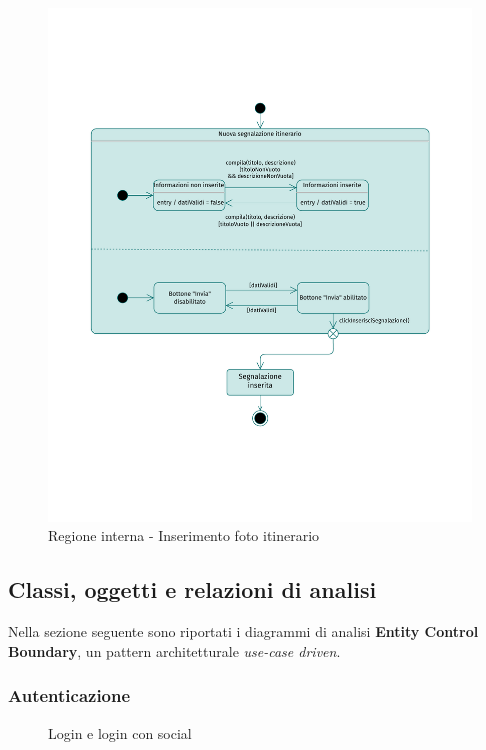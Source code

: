 \documentclass{natourDoc}
\begin{document}
\newpage
\begin{figure}[!htbp]
	\centering
	\includegraphics[width=\textwidth, page=5]{./diagrams/statechart.pdf}
	\caption{Regione interna - Inserimento foto itinerario}
\end{figure}
\FloatBarrier

\newpage
\subsection{Classi, oggetti e relazioni di analisi}
Nella sezione seguente sono riportati i diagrammi di analisi \textbf{Entity Control Boundary}, un pattern architetturale \textit{use-case driven}.

\subsubsection{Autenticazione}
\begin{figure}[!htbp]
	\centering
	
	\caption{Login e login con social}
\end{figure}
\FloatBarrier
\end{document}
